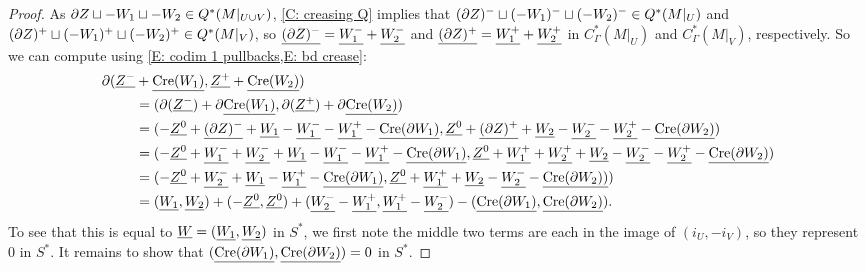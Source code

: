 \begin{proof}
	As $\partial Z \sqcup - W_1 \sqcup -W_2 \in Q^*(M|_{U \cup V})$, \cref{C: creasing Q} implies that $(\partial Z)^- \sqcup (- W_1)^- \sqcup (-W_2)^- \in Q^*(M|_U)$ and $(\partial Z)^+ \sqcup (- W_1)^+ \sqcup (-W_2)^+ \in Q^*(M|_V)$, so $\underline{(\partial Z)^- }= \underline{W_1^-} + \underline{W_2^-}$ and $\underline{(\partial Z)^+} = \underline{W_1^+} + \underline{W_2^+}$ in $C^*_\Gamma(M|_U)$ and $C^*_\Gamma(M|_V)$, respectively.
	So we can compute using \cref{E: codim 1 pullbacks,E: bd crease}:
	\begin{align*}
		\partial (\underline{Z^-}&+\underline{\mathrm{Cre}(W_1)},\underline{Z^+}+\underline{\mathrm{Cre}(W_2)})\\
		&= (\partial (\underline{Z^-})+\partial \underline{\mathrm{Cre}(W_1)},\partial (\underline{Z^+})+\partial\underline{\mathrm{Cre}(W_2)})\\
		& = (-\underline{Z^0} + \underline{(\partial Z)^-}+\underline{W_1} -\underline{W_1^-} - \underline{W_1^+} -\underline{\mathrm{Cre}(\partial W_1)},\underline{Z^0} + \underline{(\partial Z)^+} +\underline{W_2} -\underline{W_2^-} -\underline{W_2^+} -\underline{\mathrm{Cre}(\partial W_2)})\\
		& = (-\underline{Z^0} + \underline{W_1^-} + \underline{W_2^-} +\underline{W_1} -\underline{W_1^-} -\underline{W_1^+} -\underline{\mathrm{Cre}(\partial W_1)},\underline{Z^0}+ \underline{W_1^+}+ \underline{W_2^+} +\underline{W_2} -\underline{W_2^-} -\underline{W_2^+} -\underline{\mathrm{Cre}(\partial W_2)})\\
		& = (-\underline{Z^0} + \underline{W_2^-} + \underline{W_1} -\underline{W_1^+} -\underline{\mathrm{Cre}(\partial W_1)},\underline{Z^0}+ \underline{W_1^+} + \underline{W_2} -\underline{W_2^-} -\underline{\mathrm{Cre}(\partial W_2))})\\
		& = (\underline{W_1},\underline{W_2})+ (-\underline{Z^0},\underline{Z^0}) + (\underline{W_2^-}-\underline{W_1^+}, \underline{W_1^+} -\underline{W_2^-}) -(\underline{\mathrm{Cre}(\partial W_1)},\underline{\mathrm{Cre}(\partial W_2)}).
	\end{align*}
	To see that this is equal to $\underline{W} = (\underline{W_1},\underline{W_2})$ in $S^*$, we first note the middle two terms are each in the image of $(i_U, -i_V)$, so they represent $0$ in $S^*$.
	It remains to show that $(\underline{\mathrm{Cre}(\partial W_1)},\underline{\mathrm{Cre}(\partial W_2)})=0$ in $S^*$.


\end{proof}
